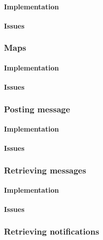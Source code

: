 \paragraph*{Implementation}

\paragraph*{Issues}


\subsubsection*{Maps}

\paragraph*{Implementation}

\paragraph*{Issues}


\subsubsection*{Posting message}

\paragraph*{Implementation}

\paragraph*{Issues}


\subsubsection*{Retrieving messages}

\paragraph*{Implementation}

\paragraph*{Issues}


\subsubsection*{Retrieving notifications}

